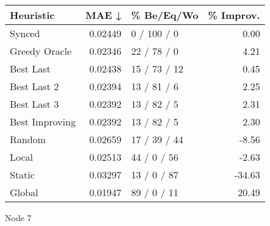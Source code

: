 \begin{tabular}{lrlr}
\toprule
\textbf{Heuristic} & \textbf{MAE ↓} & \textbf{\% Be/Eq/Wo} & \textbf{\% Improv.} \\
\midrule
            Synced &        0.02449 &          0 / 100 / 0 &                0.00 \\
     Greedy Oracle &        0.02346 &          22 / 78 / 0 &                4.21 \\
         Best Last &        0.02438 &         15 / 73 / 12 &                0.45 \\
       Best Last 2 &        0.02394 &          13 / 81 / 6 &                2.25 \\
       Best Last 3 &        0.02392 &          13 / 82 / 5 &                2.31 \\
    Best Improving &        0.02392 &          13 / 82 / 5 &                2.30 \\
            Random &        0.02659 &         17 / 39 / 44 &               -8.56 \\
             Local &        0.02513 &          44 / 0 / 56 &               -2.63 \\
            Static &        0.03297 &          13 / 0 / 87 &              -34.63 \\
            Global &        0.01947 &          89 / 0 / 11 &               20.49 \\
\bottomrule
\end{tabular}
\caption{Node 7}
\label{tab:non_lr05_le1_bs4_7}
